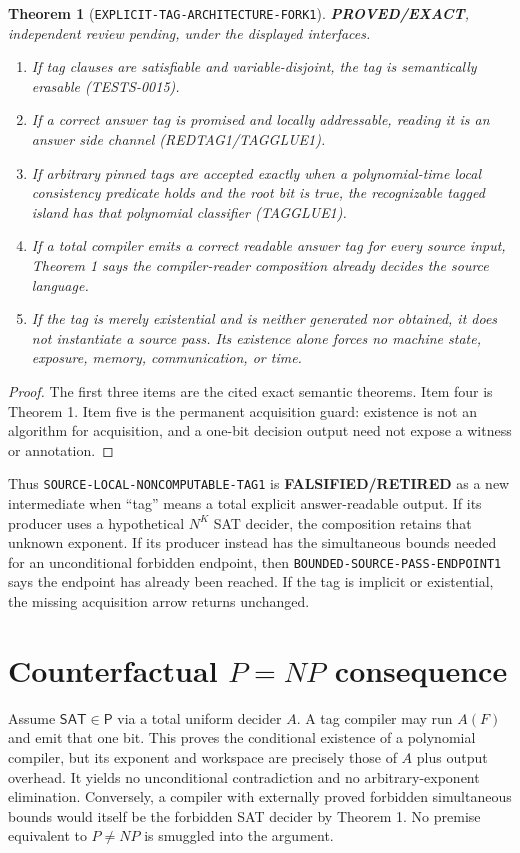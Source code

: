 \documentclass[11pt]{article}
\newtheorem{theorem}{Theorem}
\newcommand{\SAT}{\mathsf{SAT}}
\newcommand{\Pclass}{\mathsf P}
\newcommand{\EXACT}{\textbf{PROVED/EXACT}}
\newcommand{\RETIRED}{\textbf{FALSIFIED/RETIRED}}
\begin{document}
\begin{theorem}[\texttt{EXPLICIT-TAG-ARCHITECTURE-FORK1}]
\EXACT, independent review pending, under the displayed interfaces.
\begin{enumerate}
\item If tag clauses are satisfiable and variable-disjoint, the tag is
semantically erasable (TESTS-0015).
\item If a correct answer tag is promised and locally addressable, reading it
is an answer side channel (REDTAG1/TAGGLUE1).
\item If arbitrary pinned tags are accepted exactly when a polynomial-time
local consistency predicate holds and the root bit is true, the recognizable
tagged island has that polynomial classifier (TAGGLUE1).
\item If a total compiler emits a correct readable answer tag for every
source input, Theorem 1 says the compiler-reader composition already decides
the source language.
\item If the tag is merely existential and is neither generated nor obtained,
it does not instantiate a source pass.  Its existence alone forces no machine
state, exposure, memory, communication, or time.
\end{enumerate}
\end{theorem}
\begin{proof}
The first three items are the cited exact semantic theorems.  Item four is
Theorem 1.  Item five is the permanent acquisition guard: existence is not an
algorithm for acquisition, and a one-bit decision output need not expose a
witness or annotation.
\end{proof}

Thus \texttt{SOURCE-LOCAL-NONCOMPUTABLE-TAG1} is \RETIRED{} as a new
intermediate when ``tag'' means a total explicit answer-readable output.  If
its producer uses a hypothetical $N^K$ SAT decider, the composition retains
that unknown exponent.  If its producer instead has the simultaneous bounds
needed for an unconditional forbidden endpoint, then
\texttt{BOUNDED-SOURCE-PASS-ENDPOINT1} says the endpoint has already been
reached.  If the tag is implicit or existential, the missing acquisition
arrow returns unchanged.

\section{Counterfactual $P=NP$ consequence}

Assume $\SAT\in\Pclass$ via a total uniform decider $A$.  A tag compiler may
run $A(F)$ and emit that one bit.  This proves the conditional existence of a
polynomial compiler, but its exponent and workspace are precisely those of
$A$ plus output overhead.  It yields no unconditional contradiction and no
arbitrary-exponent elimination.  Conversely, a compiler with externally
proved forbidden simultaneous bounds would itself be the forbidden SAT
decider by Theorem 1.  No premise equivalent to $P\ne NP$ is smuggled into the
argument.
\end{document}
